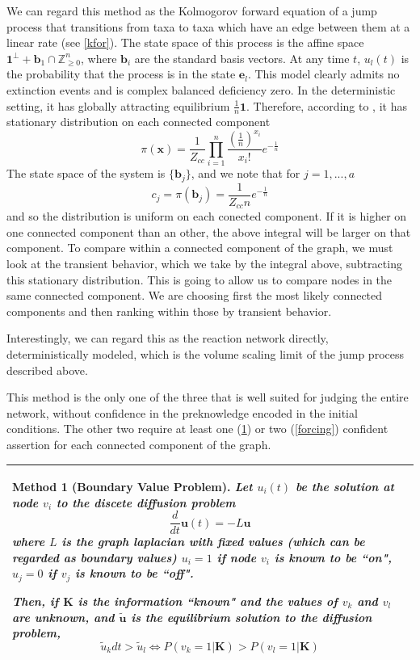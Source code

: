\documentclass[10pt]{article}
\newtheorem{method}{Method}
\theoremstyle{definition}
\numberwithin{theorem}{section}
\numberwithin{definition}{section}
\numberwithin{lemma}{section}
\numberwithin{corollary}{section}
\numberwithin{clm}{section}
\numberwithin{rmk}{section}
\newenvironment{inbox2}
{\begin{center}
		\begin{tabular}{|p{0.9\textwidth}|}
			\hline \vspace{-0.5 cm}
		}
		{ 
			\\ \hline
		\end{tabular} 
	\end{center}
}
\renewcommand{\b}{\bm}
\newcommand{\bZ}{\mathbb{Z}}
\begin{document}
We can regard this method as the Kolmogorov forward equation of a jump process that transitions from taxa to taxa which have an edge between them at a linear rate (see \cref{kfor}). The state space of this process is the affine space $\b{1}^{\perp} + \b{b}_1\cap \bZ^n_{\geq 0}$, where $\b{b}_i$ are the standard basis vectors. At any time $t$, $u_l(t)$ is the probability that the process is in the state $\b{e}_l$. This model clearly admits no extinction events and is complex balanced deficiency zero. In the deterministic setting, it has globally attracting equilibrium $\frac{1}{n}\b{1}$. Therefore, according to \cite{Anderson2010}, it has stationary distribution on each connected component
\[
\pi(\b{x}) = \frac{1}{Z_{cc}} \prod_{i=1}^n \frac{\left(\frac{1}{n}\right)^{x_i}}{x_i!}e^{-\frac{1}{n}}
\]
The state space of the system is $\{\b{b}_j\}$, and we note that for $j = 1,...,a$
\[
c_j = \pi(\b{b}_j) = \frac{1}{Z_{cc} n}e^{-\frac{1}{n}}
\]
and so the distribution is uniform on each conected component. If it is higher on one connected  component than an other, the above integral will be larger on that component. To compare within a connected component of the graph, we must look at the transient behavior, which we take by the integral above, subtracting this stationary distribution. This is going to allow us to compare nodes in the same connected component. We are choosing first the most likely connected components and then ranking within those by transient behavior. 

Interestingly, we can regard this as the reaction network directly, deterministically modeled, which is the volume scaling limit of the jump process described above.

This method is the only one of the three that is well suited for judging the entire network, without confidence in the preknowledge encoded in the initial conditions. The other two require at least one (\cref{boundarVal}) or two (\cref{forcing}) confident assertion for each connected component of the graph.

\begin{inbox2}
	\begin{method}[Boundary Value Problem]\label{boundarVal}
Let $u_i(t)$ be the solution at node $v_i$ to the discete diffusion problem
\[
\frac{d}{dt}\b{u}(t)  = - L\b{u}
\]
where $L$ is the  graph laplacian with fixed values (which can be regarded as boundary values) $u_i = 1$ if node $v_i$ is known to be ``on", $u_j = 0$ if $v_j$ is known to be ``off". 

Then, if $\b{K}$ is the information ``known" and the values of $v_{k}$ and $v_{l}$ are unknown, and $\b{\tilde{u}}$ is the equilibrium solution to the diffusion problem,
\[
\tilde{u}_k dt >  \tilde{u}_l \Leftrightarrow  P(v_k=  1|\b{K}) > P(v_l = 1|\b{K})
\]
	\end{method}
\end{inbox2}
\end{document}
